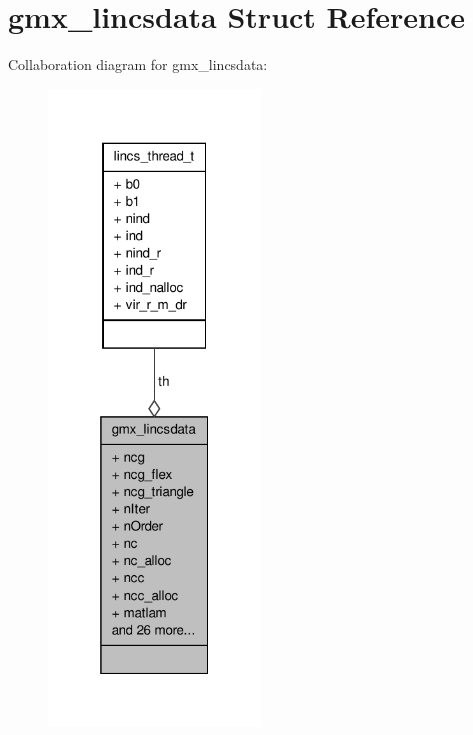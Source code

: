 \hypertarget{structgmx__lincsdata}{\section{gmx\-\_\-lincsdata \-Struct \-Reference}
\label{structgmx__lincsdata}
}


\-Collaboration diagram for gmx\-\_\-lincsdata\-:
\nopagebreak
\begin{figure}[H]
\begin{center}
\leavevmode
\includegraphics[width=160pt]{structgmx__lincsdata__coll__graph}
\end{center}
\end{figure}
